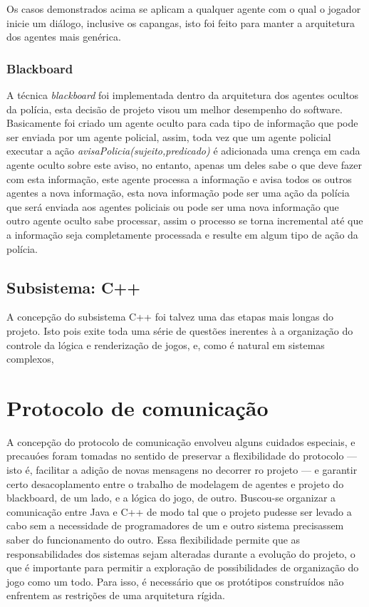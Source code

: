 Os casos demonstrados acima se aplicam a qualquer agente com o qual o jogador inicie um diálogo, inclusive os capangas, isto foi feito para manter a arquitetura dos agentes mais genérica.

\subsubsection{Blackboard}

A técnica \emph{blackboard} foi implementada dentro da arquitetura dos agentes ocultos da polícia, esta decisão de projeto visou um melhor desempenho do software.
Basicamente foi criado um agente oculto para cada tipo de informação que pode ser enviada por um agente policial, assim, toda vez que um agente policial executar a ação \emph{avisaPolicia(sujeito,predicado)} é adicionada uma crença em cada agente oculto sobre este aviso, no entanto, apenas um deles sabe o que deve fazer com esta informação, este agente processa a informação e avisa todos os outros agentes a nova informação, esta nova informação pode ser uma ação da polícia que será enviada aos agentes policiais ou pode ser uma nova informação que outro agente oculto sabe processar, assim o processo se torna incremental até que a informação seja completamente processada e resulte em algum tipo de ação da polícia.


\subsection{Subsistema: C++}

A concepção do subsistema C++ foi talvez uma das etapas mais longas do
projeto. Isto pois exite toda uma série de questões inerentes à a organização
do controle da lógica e renderização de jogos, e, como é natural em
sistemas complexos, 

\section{Protocolo de comunicação}

A concepção do protocolo de comunicação envolveu alguns cuidados especiais, e precauóes foram tomadas no sentido de preservar a flexibilidade do protocolo --- isto é, facilitar a adição de novas mensagens no decorrer ro projeto --- e garantir certo desacoplamento entre o trabalho de modelagem de agentes e projeto do blackboard, de um lado, e a lógica do jogo, de outro. Buscou-se organizar a comunicação entre Java e C++ de modo tal que o projeto pudesse ser levado a cabo sem a necessidade de programadores de um e outro sistema precisassem saber do funcionamento do outro. Essa flexibilidade permite que as responsabilidades dos sistemas sejam alteradas durante a evolução do projeto, o que é importante para permitir a exploração de possibilidades de organização do jogo como um todo. Para isso, é necessário que os protótipos construídos não enfrentem as restrições de uma arquitetura rígida.

